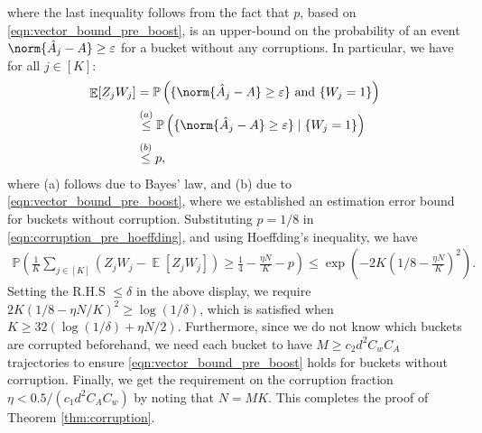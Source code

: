 \documentclass[letterpaper, 11 pt]{article}
\DeclareMathOperator{\E}{\mathbb{E}}
\begin{document}
where the last inequality follows from the fact that $p$, based on \eqref{eqn:vector_bound_pre_boost}, is an upper-bound on the probability of an event $\norm{\hat{A}_j - A} \geq \varepsilon$ for a bucket without any corruptions. In particular, we have for all $j \in [K]$: 
\begin{align*}
    \E[Z_jW_j] &= \mathbb{P}\left( \{ \norm{\hat{A}_j - A} \geq \varepsilon\} \text{ and } \{ W_j = 1\}\right)\\
    &\overset{(a)}{\leq} \mathbb{P}\left(\{ \norm{\hat{A}_j - A} \geq \varepsilon\} \mid \{ W_j = 1\} \right)\\
    &\overset{(b)}{\leq} p,
\end{align*}
where (a) follows due to Bayes' law, and (b) due to \eqref{eqn:vector_bound_pre_boost}, where we established an estimation error bound for buckets without corruption.
Substituting $p = 1/8$ in \eqref{eqn:corruption_pre_hoeffding}, and using Hoeffding's inequality, we have 
\begin{align*}
    \mathbb{P} \left( \frac{1}{K} \sum_{j \in [K]} (Z_jW_j - \E[Z_jW_j]) \geq \frac{1}{4} - \frac{\eta N}{K} - p \right) \leq \exp{\left(-2 K \left(1/8 - \frac{\eta N}{K}\right)^2\right)}.
\end{align*}
Setting the R.H.S $\leq \delta$ in the above display, we require $2K (1/8 - \eta N/K)^2 \geq \log(1/\delta)$, which is satisfied when $K \geq 32(\log(1/\delta) + \eta N/2)$. Furthermore, since we do not know which buckets are corrupted beforehand, we need each bucket to have $M \geq c_2 d^2 C_w C_A$ trajectories to ensure \eqref{eqn:vector_bound_pre_boost} holds for buckets without corruption. Finally, we get the requirement on the corruption fraction $\eta < 0.5/(c_1d^2C_AC_w)$ by noting that $N = MK$. This completes the proof of Theorem \ref{thm:corruption}.
\end{document}
